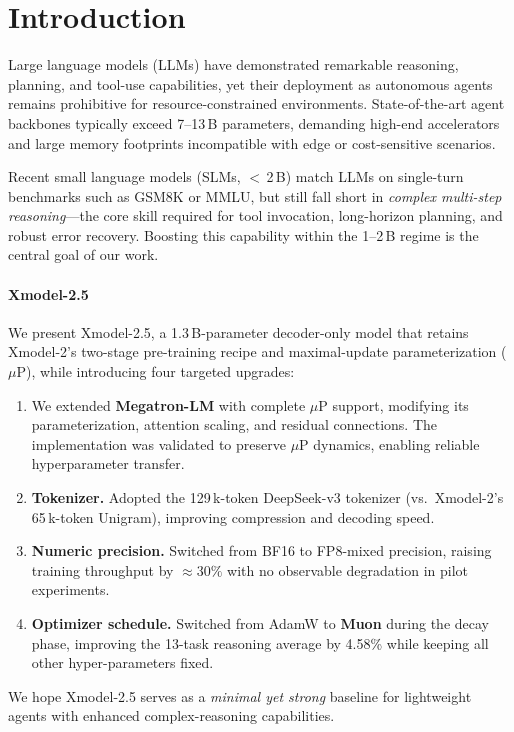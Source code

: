 \section{Introduction}

Large language models (LLMs) have demonstrated remarkable reasoning, planning, and tool-use capabilities, yet their deployment as autonomous agents remains prohibitive for resource-constrained environments.
State-of-the-art agent backbones typically exceed 7--13\,B parameters, demanding high-end accelerators and large memory footprints incompatible with edge or cost-sensitive scenarios.

Recent small language models (SLMs, $<$\,2\,B) match LLMs on single-turn benchmarks such as GSM8K or MMLU, but still fall short in \emph{complex multi-step reasoning}—the core skill required for tool invocation, long-horizon planning, and robust error recovery.
Boosting this capability within the 1--2\,B regime is the central goal of our work.

\paragraph{Xmodel-2.5}
We present Xmodel-2.5, a 1.3\,B-parameter decoder-only model that retains Xmodel-2's two-stage pre-training recipe and maximal-update parameterization ($\mu$P), while introducing four targeted upgrades:

\begin{enumerate}
  \item We extended \textbf{Megatron-LM} with complete $\mu$P support, modifying its parameterization, attention scaling, and residual connections. The implementation was validated to preserve $\mu$P dynamics, enabling reliable hyperparameter transfer.

  \item \textbf{Tokenizer.} Adopted the 129\,k-token DeepSeek-v3 tokenizer (vs.\ Xmodel-2's 65\,k-token Unigram), improving compression and decoding speed.

  \item \textbf{Numeric precision.} Switched from BF16 to FP8-mixed precision, raising training throughput by $\approx 30\%$ with no observable degradation in pilot experiments.

  \item \textbf{Optimizer schedule.} Switched from AdamW to \textbf{Muon} during the decay phase, improving the 13-task reasoning average by 4.58\% while keeping all other hyper-parameters fixed.

\end{enumerate}

We hope Xmodel-2.5 serves as a \emph{minimal yet strong} baseline for lightweight agents with enhanced complex-reasoning capabilities.